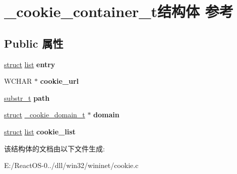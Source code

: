 \hypertarget{struct__cookie__container__t}{}\section{\+\_\+cookie\+\_\+container\+\_\+t结构体 参考}
\label{struct__cookie__container__t}
\subsection*{Public 属性}
\begin{DoxyCompactItemize}
\item 
\mbox{\label{struct__cookie__container__t_ac266c222f38d12bb7a7a85b47c6f35bd}} 
\hyperlink{interfacestruct}{struct} \hyperlink{classlist}{list} {\bfseries entry}
\item 
\mbox{\label{struct__cookie__container__t_a2647da333a0d2b84b696009c49589ae9}} 
W\+C\+H\+AR $\ast$ {\bfseries cookie\+\_\+url}
\item 
\mbox{\label{struct__cookie__container__t_a66beea9f686e49277ce0c6a90b87630d}} 
\hyperlink{structsubstr__t}{substr\+\_\+t} {\bfseries path}
\item 
\mbox{\label{struct__cookie__container__t_ae9952626e9a523d2d0f4090fa2b9fc84}} 
\hyperlink{interfacestruct}{struct} \hyperlink{struct__cookie__domain__t}{\+\_\+cookie\+\_\+domain\+\_\+t} $\ast$ {\bfseries domain}
\item 
\mbox{\label{struct__cookie__container__t_a5c03e3c5e6fbddfc32df1b43793ee358}} 
\hyperlink{interfacestruct}{struct} \hyperlink{classlist}{list} {\bfseries cookie\+\_\+list}
\end{DoxyCompactItemize}


该结构体的文档由以下文件生成\+:\begin{DoxyCompactItemize}
\item 
E\+:/\+React\+O\+S-\/0../dll/win32/wininet/cookie.\+c\end{DoxyCompactItemize}
